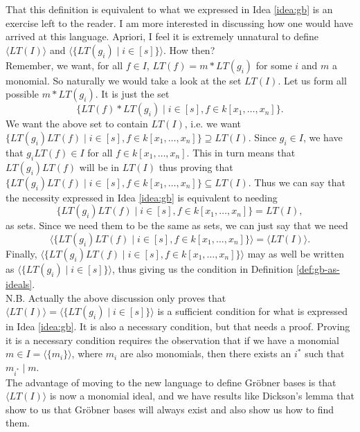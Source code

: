 \documentclass[11pt]{article}
\newcommand{\gb}{Gr\"{o}bner }
\newcommand*{\ideal}[1]{\langle#1\rangle}
\begin{document}
That this definition is equivalent to what we expressed in Idea \ref{idea:gb} is an exercise left to the reader. I am more interested in discussing how one would have arrived at this language. Apriori, I feel it is extremely unnatural to define $\ideal{LT(I)}$ and $\ideal{\{LT(g_i) \mid i \in [s]\}}$. How then? \\

Remember, we want, for all $f \in I$, $LT(f) = m*LT(g_i)$ for some $i$ and $m$ a monomial. So naturally we would take a look at the set $LT(I)$. Let us form all possible $m*LT(g_i)$. It is just the set
\[
\{LT(f) * LT(g_i) \mid i \in [s], f \in k[x_1, \ldots, x_n]\}.
\]
We want the above set to contain $LT(I)$, i.e. we want $\{LT(g_i)LT(f) \mid i \in [s], f \in k[x_1, \ldots, x_n]\} \supseteq LT(I)$. Since $g_i \in I$, we have that $g_iLT(f) \in I$ for all $f \in k[x_1, \ldots, x_n]$. This in turn means that $LT(g_i)LT(f)$ will be in $LT(I)$ thus proving that $\{LT(g_i)LT(f) \mid i \in [s], f \in k[x_1, \ldots, x_n]\} \subseteq LT(I)$. Thus we can say that the necessity expressed in Idea \ref{idea:gb} is equivalent to needing
\[\{LT(g_i)LT(f) \mid i \in [s], f \in k[x_1, \ldots, x_n]\} = LT(I),\]
as sets. Since we need them to be the same as sets, we can just say that we need
\[\ideal{\{LT(g_i)LT(f) \mid i \in [s], f \in k[x_1, \ldots, x_n]\}} = \ideal{LT(I)}.\] Finally, $\ideal{\{LT(g_i)LT(f) \mid i \in [s], f \in k[x_1, \ldots, x_n]\}}$ may as well be written as $\ideal{\{LT(g_i) \mid i \in [s]\}}$, thus giving us the condition in Definition \ref{def:gb-as-ideals}. \\

N.B. Actually the above discussion only proves that $\ideal{LT(I)} = \ideal{\{LT(g_i) \mid i \in [s]\}}$ is a sufficient condition for what is expressed in Idea \ref{idea:gb}. It is also a necessary condition, but that needs a proof. Proving it is a necessary condition requires the observation that if we have a monomial $m \in I = \ideal{\{m_i\}}$, where $m_i$ are also monomials, then there exists an $i^*$ such that $m_{i^*} \mid m$. \\

The advantage of moving to the new language to define \gb bases is that $\ideal{LT(I)}$ is now a monomial ideal, and we have results like Dickson's lemma that show to us that \gb bases will always exist and also show us how to find them.
%
% 
\end{document}
